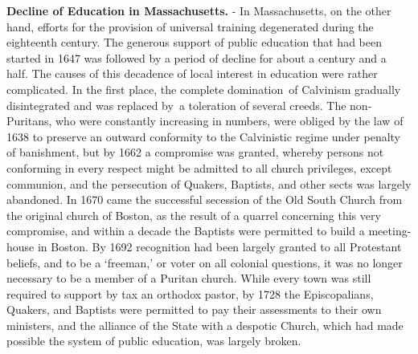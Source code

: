 \documentclass[
]{book}
\begin{document}
\textbf{Decline of Education in Massachusetts.} - In Massachusetts, on the other hand, efforts for the provision of universal training degenerated during the eighteenth century. The generous support of public education that had been started in 1647 was followed by a period of decline for about a century and a half. The causes of this decadence of local interest in education were rather complicated. In the first place, the complete domination~of Calvinism gradually disintegrated and was replaced by~a toleration of several creeds. The non-Puritans, who were constantly increasing in numbers, were obliged by the law of 1638 to preserve an outward conformity to the Calvinistic regime under penalty of banishment, but by 1662 a compromise was granted, whereby persons not conforming in every respect might be admitted to all church privileges, except communion, and the persecution of Quakers, Baptists, and other sects was largely abandoned. In 1670 came the successful secession of the Old South Church from the original church of Boston, as the result of a quarrel concerning this very compromise, and within a decade the Baptists were permitted to build a meeting-house in Boston. By 1692 recognition had been largely granted to all Protestant beliefs, and to be a `freeman,' or voter on all colonial questions, it was no longer necessary to be a member of a Puritan church. While every town was still required to support by tax an orthodox pastor, by 1728 the Episcopalians, Quakers, and Baptists were permitted to pay their assessments to their own ministers, and the alliance of the State with a despotic Church, which had made possible the system of public education, was largely broken.
\end{document}
